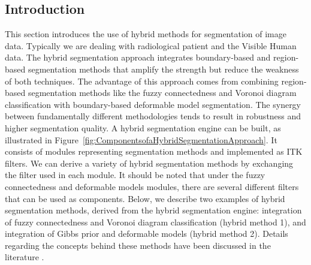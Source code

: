 %
%
%
%
%
%

\subsection{Introduction}
\label{sec:HybridSegmentationIntroduction}
This section introduces the use of hybrid methods for segmentation of image
data. Typically we are dealing with radiological patient and the Visible
Human data. The hybrid segmentation approach integrates boundary-based and
region-based segmentation methods that amplify the strength but reduce the
weakness of both techniques. The advantage of this approach comes from
combining region-based segmentation methods like the fuzzy connectedness and
Voronoi diagram classification with boundary-based deformable model
segmentation. The synergy between fundamentally different methodologies tends
to result in robustness and higher segmentation quality.  A hybrid
segmentation engine can be built, as illustrated in
Figure~\ref{fig:ComponentsofaHybridSegmentationApproach}. It consists of
modules representing segmentation methods and implemented as ITK filters. We
can derive a variety of hybrid segmentation methods by exchanging the filter
used in each module. It should be noted that under the fuzzy connectedness
and deformable models modules, there are several different filters that can
be used as components. Below, we describe two examples of hybrid segmentation
methods, derived from the hybrid segmentation engine: integration of fuzzy
connectedness and Voronoi diagram classification (hybrid method 1), and
integration of Gibbs prior and deformable models (hybrid method 2).  Details
regarding the concepts behind these methods have been discussed in the
literature
\cite{Angelini2002,Udupa2002,Jin2002,Imielinska2001,Imielinska2000a,Imielinska2000b}.




